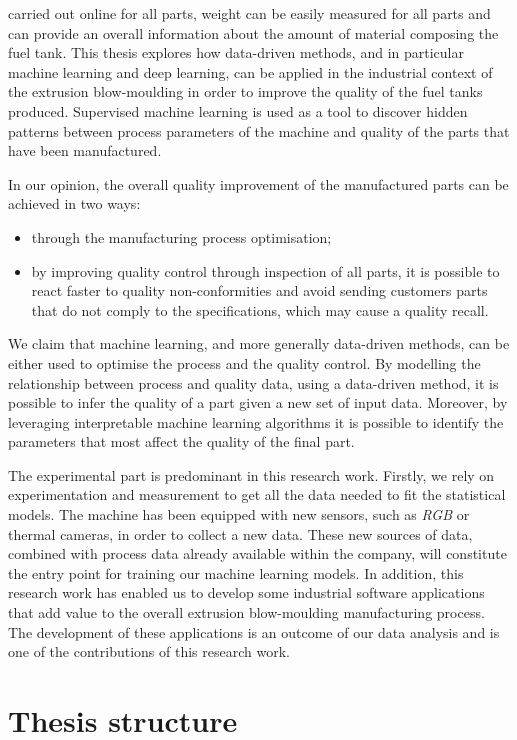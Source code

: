 carried out online for all parts, weight can be easily measured for all parts and can provide an overall information about the amount of material composing the fuel tank. This thesis explores how data-driven methods, and in particular machine learning and deep learning, can be applied in the industrial context of the extrusion blow-moulding in order to improve the quality of the fuel tanks produced. Supervised machine learning is used as a tool to discover hidden patterns between process parameters of the machine and quality of the parts that have been manufactured.

In our opinion, the overall quality improvement of the manufactured parts can be achieved in two ways:

\begin{itemize}
    \item through the manufacturing process optimisation;   
    \item by improving quality control through inspection of all parts, it is possible to react faster to quality non-conformities and avoid sending customers parts that do not comply to the specifications, which may cause a quality recall.  
\end{itemize}
%
We claim that machine learning, and more generally data-driven methods, can be either used to optimise the process and the quality control. By modelling the relationship between process and quality data, using a data-driven method, it is possible to infer the quality of a part given a new set of input data. Moreover, by leveraging interpretable machine learning algorithms it is possible to identify the parameters that most affect the quality of the final part.    

The experimental part is predominant in this research work. Firstly, we rely on experimentation and measurement to get all the data needed to fit the statistical models. The machine has been equipped with new sensors, such as \textit{RGB} or thermal cameras, in order to collect a new data. These new sources of data, combined with process data already available within the company, will constitute the entry point for training our machine learning models. In addition, this research work has enabled us to develop some industrial software applications that add value to the overall extrusion blow-moulding manufacturing process. The development of these applications is an outcome of  our data analysis and is one of the contributions of this research work.

\section*{Thesis structure}

